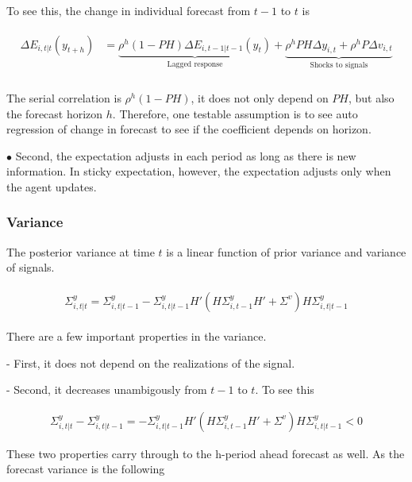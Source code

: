 \documentclass[]{article}
\begin{document}
To see this, the change in individual forecast from $t-1$ to $t$ is 

\begin{eqnarray}
\begin{aligned}
\Delta E_{i,t|t}(y_{t+h}) & = \underbrace{\rho^h (1-PH)\Delta E_{i,t-1|t-1}(y_{t})}_{\text{Lagged response}} + \underbrace{\rho^hPH \Delta y_{i,t} + \rho^h P\Delta v_{i,t}}_{\text{Shocks to signals}}\\
\end{aligned}
\end{eqnarray}

The serial correlation is $\rho^h(1-PH)$, it does not only depend on $PH$, but also the forecast horizon $h$. Therefore, one testable assumption is to see auto regression of change in forecast to see if the coefficient depends on horizon. 

$\bullet$  Second, the expectation adjusts in each period as long as there is new information. In sticky expectation, however, the expectation adjusts only when the agent updates. 


\subsubsection{Variance}

The posterior variance at time $t$ is a linear function of prior variance and variance of signals. 

\begin{eqnarray}
\begin{aligned}
\Sigma^y_{i,t|t} = \Sigma^y_{i,t|t-1} - \Sigma^y_{i,t|t-1} H'(H \Sigma^y_{i,t-1} H' +\Sigma^v) H \Sigma^y_{i,t|t-1} 
\end{aligned}
\end{eqnarray}

There are a few important properties in the variance. 

- First, it does not depend on the realizations of the signal. 

- Second, it decreases unambigously from $t-1$ to $t$. To see this 

\begin{eqnarray}
\Sigma^y_{i,t|t} - \Sigma^y_{i,t|t-1} = - \Sigma^y_{i,t|t-1} H'(H \Sigma^y_{i,t-1} H' +\Sigma^v) H \Sigma^y_{i,t|t-1} <0
\end{eqnarray}

These two properties carry through to the h-period ahead forecast as well. As the forecast variance is the following 
\end{document}
